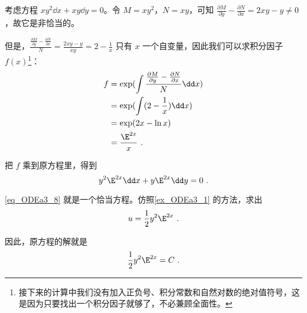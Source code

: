 \begin{example}{}
考虑方程 $xy^2\dd x+xy\dd y=0$。令 $M=xy^2$，$N=xy$，可知 $\frac{\partial M}{\partial y}-\frac{\partial N}{\partial x}=2xy-y\not=0$，故它是非恰当的。

但是，$\frac{\frac{\partial M}{\partial y}-\frac{\partial N}{\partial x}}{N}=\frac{2xy-y}{xy}=2-\frac{1}{x}$ 只有 $x$ 一个自变量，因此我们可以求积分因子 $f(x)$\footnote{接下来的计算中我们没有加入正负号、积分常数和自然对数的绝对值符号，这是因为只要找出一个积分因子就够了，不必兼顾全面性。}：
\begin{equation}
\begin{aligned}
f&=\exp(\int \frac{\frac{\partial M}{\partial y}-\frac{\partial N}{\partial x}}{N}\dd x)\\
&=\exp(\int(2-\frac{1}{x})\dd x)\\
&=\exp(2x-\ln x)\\
&=\frac{\E^{2x}}{x}~.
\end{aligned}
\end{equation}

把 $f$ 乘到原方程里，得到
\begin{equation}\label{eq_ODEa3_8}
y^2\E^{2x}\dd x+y\E^{2x}\dd y=0~.
\end{equation}

\autoref{eq_ODEa3_8} 就是一个恰当方程。仿照\autoref{ex_ODEa3_1} 的方法，求出
\begin{equation}
u=\frac{1}{2}y^2\E^{2x}~.
\end{equation}

因此，原方程的解就是
\begin{equation}
\frac{1}{2}y^2\E^{2x}=C~.
\end{equation}



\end{example}





